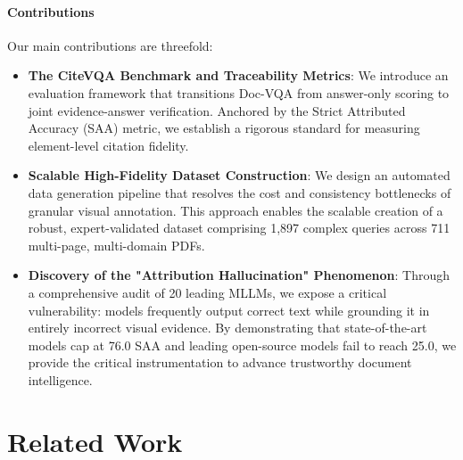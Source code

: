 \documentclass{llmxive}
\begin{document}
\paragraph{Contributions} Our main contributions are threefold:
\begin{itemize}
 \item \textbf{The CiteVQA Benchmark and Traceability Metrics}: We introduce an evaluation framework that transitions Doc-VQA from answer-only scoring to joint evidence-answer verification. Anchored by the Strict Attributed Accuracy (SAA) metric, we establish a rigorous standard for measuring element-level citation fidelity.
 \item \textbf{Scalable High-Fidelity Dataset Construction}: We design an automated data generation pipeline that resolves the cost and consistency bottlenecks of granular visual annotation. This approach enables the scalable creation of a robust, expert-validated dataset comprising 1,897 complex queries across 711 multi-page, multi-domain PDFs.
 \item \textbf{Discovery of the "Attribution Hallucination" Phenomenon}: Through a comprehensive audit of 20 leading MLLMs, we expose a critical vulnerability: models frequently output correct text while grounding it in entirely incorrect visual evidence. By demonstrating that state-of-the-art models cap at 76.0 SAA and leading open-source models fail to reach 25.0, we provide the critical instrumentation to advance trustworthy document intelligence.
\end{itemize}

\section{Related Work}
\end{document}
